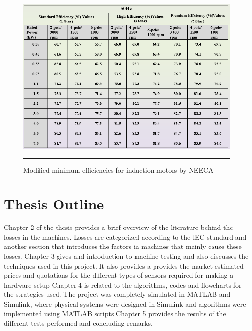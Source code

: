 \begin{figure}[htbp]
  \centering
    \includegraphics[width = 5in]{./Figures/MS/fig15.png}
    \rule{35em}{1.2pt}
  \caption{Modified minimum efficiencies for induction motors by NEECA}
  \label{fig:Modified minimum efficiencies for induction motors by NEECA}
\end{figure}

\section{Thesis Outline}
Chapter 2 of the thesis provides a brief overview of the literature behind the losses in the machines. Losses are categorized according to the IEC standard and another section that introduces the factors in machines that mainly cause these losses.
Chapter 3 gives and introduction to machine testing and also discusses the techniques used in this project. It also provides a provides the market estimated prices and quotations for the different types of sensors required for making a hardware setup
Chapter 4 is related to the algorithms, codes and flowcharts for the strategies used. The project was completely simulated in MATLAB and Simulink, where physical systems were designed in Simulink and algorithms were implemented using MATLAB scripts
Chapter 5 provides the results of the different tests performed and concluding remarks.
